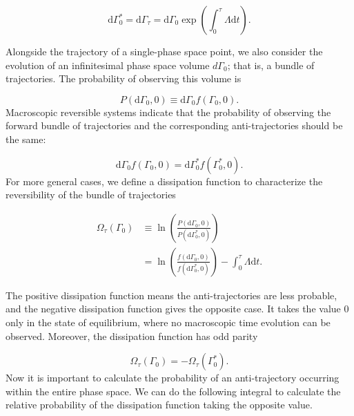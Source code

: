 \documentclass[ reprint, amsmath,amssymb, aps,]{revtex4-1}
\begin{document}
\begin{equation}\label{eq:phase_compress}
\mathrm{d}\Gamma_0^*=\mathrm{d}\Gamma_\tau=\mathrm{d}\Gamma_0\exp\left(\int_0^\tau \Lambda\mathrm{d}t\right).
\end{equation}

Alongside the trajectory of a single-phase space point, we also consider the evolution of an infinitesimal phase space volume $d\Gamma_0$; that is, a bundle of trajectories. The probability of observing this volume is

\begin{equation}
P(\mathrm{d}\Gamma_0,0)\equiv \mathrm{d}\Gamma_0 f(\Gamma_0,0) .
\end{equation}
Macroscopic reversible systems indicate that the probability of observing the forward bundle of trajectories and the corresponding anti-trajectories should be the same: 

\begin{equation}
 \mathrm{d}\Gamma_0 f(\Gamma_0,0) =\mathrm{d}\Gamma^*_0 f(\Gamma^*_0,0).
\end{equation}
For more general cases, we define a dissipation function to characterize the reversibility of the bundle of trajectories

\begin{equation}
\begin{split}
\Omega_\tau(\Gamma_0)
&\equiv \ln\left(\frac{P(\mathrm{d}\Gamma_0,0)}{P(\mathrm{d}\Gamma_0^*,0)}\right)\\
&=\ln\left(\frac{f(\mathrm{d}\Gamma_0,0)}{f(\mathrm{d}\Gamma_0^*,0)}\right)-\int_0^\tau \Lambda\mathrm{d}t.
\end{split}
\end{equation}

 The positive dissipation function means the anti-trajectories are less probable, and the negative dissipation function gives the opposite case. It takes the value $0$ only in the state of equilibrium, where no macroscopic time evolution can be observed. Moreover, the dissipation function has odd parity

\begin{equation}\label{eq:dissipation_odd}
\Omega_\tau(\Gamma_0)=-\Omega_\tau(\Gamma_0^*).
\end{equation}
Now it is important to calculate the probability of an anti-trajectory occurring within the entire phase space. We can do the following integral to calculate the relative probability of the dissipation function taking the opposite value.
\end{document}
